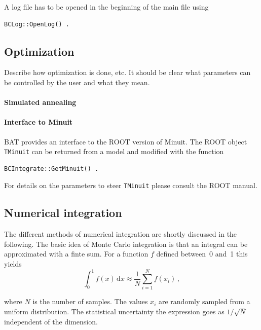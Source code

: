 \documentclass[11pt, a4paper]{article}
\begin{document}
A log file has to be opened in the beginning of the main file using 
%
\begin{verbatim} 
BCLog::OpenLog() . 
\end{verbatim} 


\subsection{Optimization} 
\label{subsection:optimization} 

Describe how optimization is done, etc. It should be clear what
parameters can be controlled by the user and what they mean.

\paragraph{Simulated annealing} 

\paragraph{Interface to Minuit} 

BAT provides an interface to the ROOT version of Minuit. The ROOT object 
\verb|TMinuit| can be returned from a model and modified with the function 
%
\begin{verbatim}
BCIntegrate::GetMinuit() . 
\end{verbatim} 

\noindent 
For details on the parameters to steer \verb|TMinuit| please consult the ROOT manual. 


\subsection{Numerical integration} 
\label{subsection:integration} 

The different methods of numerical integration are shortly discussed
in the following. The basic idea of Monte Carlo integration is that an
integral can be approximated with a finte sum. For a function $f$
defined between~0 and~1 this yields
% 
\begin{equation}
\int_{0}^{1} f(x) \, \mathrm{d}x \approx \frac{1}{N} \sum_{i=1}^{N} f(x_{i}) \, , 
\label{eqn:integration}
\end{equation} 

\noindent 
where $N$ is the number of samples. The values $x_{i}$ are randomly
sampled from a uniform distribution. The statistical uncertainty the
expression goes as $1/\sqrt{N}$ independent of the dimension. 
\end{document}
